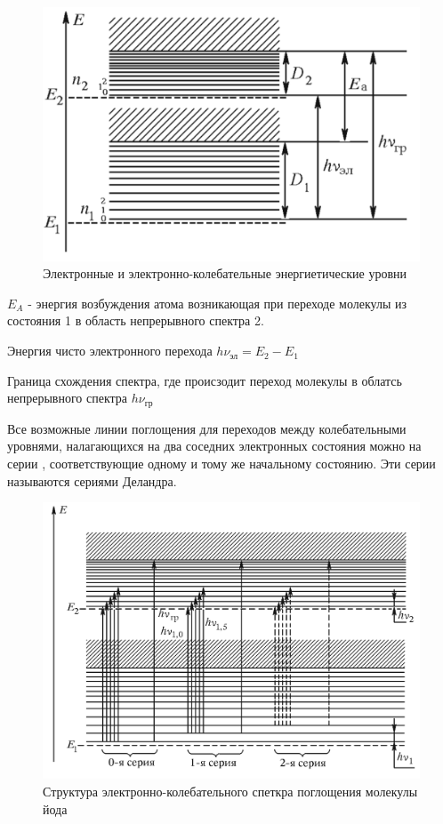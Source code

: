 \documentclass[a4paper]{article}
\begin{document}
\begin{figure}[H]
    \begin{center}
    \includegraphics[scale = 0.3]{p4.png}
    \caption{Электронные и электронно-колебательные энергиетические уровни}
    \label{p4}
    \end{center}
\end{figure}

$E_A$ - энергия возбуждения атома возникающая при переходе молекулы из состояния 1 в область 
непрерывного спектра 2. \par
Энергия чисто электронного перехода $h\nu_{\text{эл}} = E_2 - E_1$\par
Граница схождения спектра, где происзодит переход молекулы в облатсь непрерывного спектра $h\nu_{\text{гр}}$\par

Все возможные линии поглощения для переходов между колебательными уровнями, налагающихся
на два соседних электронных состояния можно на серии , соответствующие одному и тому же
начальному состоянию. Эти серии называются сериями Деландра.


\begin{figure}[H]
    \begin{center}
    \includegraphics[scale = 0.3]{p5.png}
    \caption{Структура электронно-колебательного спеткра поглощения молекулы йода}
    \label{p5}
    \end{center}
\end{figure}
\end{document}
